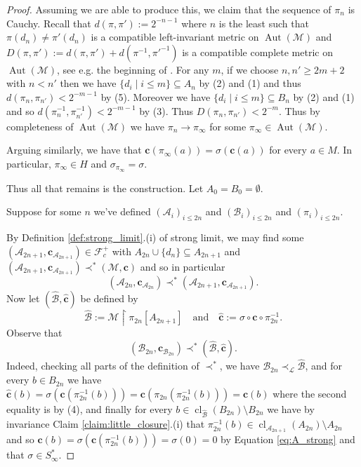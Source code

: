 \documentclass[12pt]{amsart}
\theoremstyle{plain}
\theoremstyle{definition}
\newcommand{\mcA}{\mathcal{A}}
\newcommand{\mcB}{\mathcal{B}}
\newcommand{\mcF}{\mathcal{F}}
\newcommand{\mcL}{\mathcal{L}}
\newcommand{\mcM}{\mathcal{M}}
\newcommand{\oc}{\mathbf{c}}
\DeclareMathOperator{\Aut}{Aut}
\DeclareMathOperator{\cl}{cl}
\begin{document}
\begin{proof}
Assuming we are able to produce this, we claim that the sequence of $\pi_n$ is Cauchy.
Recall that $d(\pi, \pi') := 2^{-n-1}$ where $n$ is the least such that $\pi(d_n) \neq \pi'(d_n)$ is a compatible left-invariant metric on $\Aut(\mcM)$ and $D(\pi, \pi') := d(\pi, \pi') + d(\pi^{-1}, \pi'^{-1})$ is a compatible complete metric on $\Aut(\mcM)$, see e.g. the beginning of \cite[1.5]{BeckerKechris1996}.
For any $m$, if we choose $n, n' \ge 2m+2$ with $n < n'$ then we have $\{d_i \mid i \le m\} \subseteq A_n$ by (2) and (1) and thus $d(\pi_n, \pi_{n'}) < 2^{-m-1}$ by (5).
Moreover we have $\{d_i \mid i \le m\} \subseteq B_n$ by (2) and (1) and so $d(\pi^{-1}_n, \pi^{-1}_{n'}) <2^{-m-1}$ by (3).
Thus $D(\pi_n, \pi_{n'}) < 2^{-m}$.
Thus by completeness of $\Aut(\mcM)$ we have $\pi_n \rightarrow \pi_\infty$ for some $\pi_\infty \in \Aut(\mcM)$.

Arguing similarly, we have that $\oc(\pi_\infty(a)) = \sigma(\oc(a))$ for every $a \in M$.
In particular, $\pi_\infty \in H$ and $\sigma_{\pi_\infty} = \sigma$.

Thus all that remains is the construction.
Let $A_0 = B_0 = \emptyset$.

Suppose for some $n$ we've defined $(\mcA_i)_{i \le 2n}$ and $(\mcB_i)_{i \le 2n}$ and $(\pi_i)_{i \le 2n}$.

By Definition \ref{def:strong_limit}.(i) of strong limit, we may find some $(\mcA_{2n+1}, \oc_{\mcA_{2n+1}}) \in \mcF^+_c$ with $A_{2n}\cup\{d_n\} \subseteq A_{2n+1}$ and $(\mcA_{2n+1}, \oc_{\mcA_{2n+1}}) \prec^* (\mcM, \oc)$ and so in particular 
\begin{equation}\label{eq:A_strong}
(\mcA_{2n}, \oc_{\mcA_{2n}}) \prec^* (\mcA_{2n+1}, \oc_{\mcA_{2n+1}}).
\end{equation}
Now let $(\hat{\mcB}, \hat{\oc})$ be defined by
\[\hat{\mcB} := \mcM \upharpoonright \pi_{2n}[A_{2n+1}] \quad \text{and} \quad \hat{\oc} := \sigma \circ \oc \circ \pi_{2n}^{-1}.\]
Observe that 
\begin{equation}\label{eq:B_strong}
(\mcB_{2n}, \oc_{\mcB_{2n}}) \prec^* (\hat{\mcB}, \hat{\oc}).
\end{equation}
Indeed, checking all parts of the definition of $\prec^*$, we have $\mcB_{2n} \prec_\mcL \hat{\mcB}$, and for every $b \in B_{2n}$ we have $\hat{\oc}(b) = \sigma(\oc(\pi_{2n}^{-1}(b))) = \oc(\pi_{2n}(\pi_{2n}^{-1}(b))) = \oc(b)$ where the second equality is by (4), and finally for every $b \in \cl_{\hat{\mcB}}(B_{2n}) \setminus B_{2n}$ we have by invariance Claim \ref{claim:little_closure}.(i) that $\pi_{2n}^{-1}(b) \in \cl_{\mcA_{2n+1}}(A_{2n}) \setminus A_{2n}$ and so $\hat{\oc}(b) = \sigma(\oc(\pi_{2n}^{-1}(b))) = \sigma(0) = 0$ by Equation \ref{eq:A_strong} and that $\sigma \in S^*_\infty$.


\end{proof}
\end{document}
